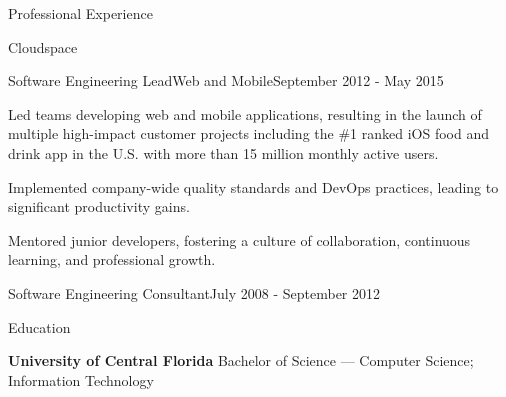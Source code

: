\documentclass{resume} %
\begin{document}
\begin{rSection}{Professional Experience}
  \begin{rCompany}{Cloudspace}{}{}
    \begin{rRole}{Software Engineering Lead}{Web and Mobile}{September 2012 - May 2015}
      \item Led teams developing web and mobile applications, resulting in the launch of multiple high-impact customer projects including the \#1 ranked iOS food and drink app in the U.S. with more than 15 million monthly active users.
      \item Implemented company-wide quality standards and DevOps practices, leading to significant productivity gains.
      \item Mentored junior developers, fostering a culture of collaboration, continuous learning, and professional growth.
    \end{rRole}
  \end{rCompany}

  
  \begin{rCompany}{Software Engineering Consultant}{July 2008 - September 2012}{}

  \end{rCompany}
  
  
  
\end{rSection}

\vspace{0.5em} %
\begin{rSection}{Education}
  
  {\bf University of Central Florida } Bachelor of Science --- Computer Science; Information Technology
  
\end{rSection}
\end{document}
